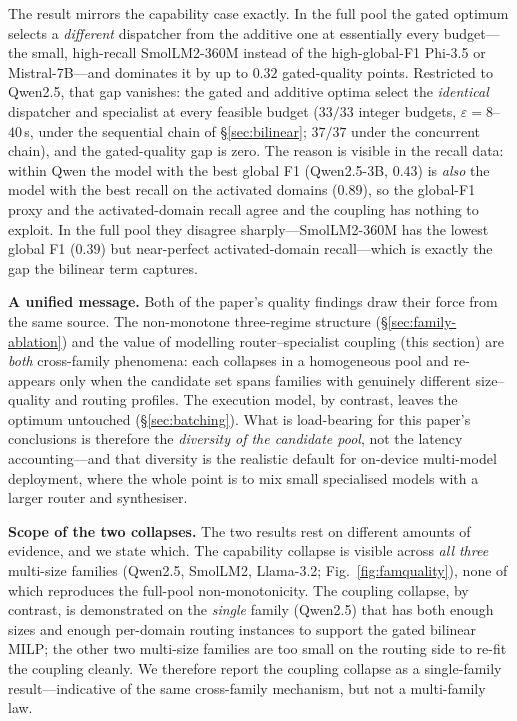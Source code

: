 \documentclass[11pt]{article}
\newcommand{\eps}{\varepsilon}
\begin{document}
The result mirrors the capability case exactly. In the full pool the gated optimum
selects a \emph{different} dispatcher from the additive one at essentially every
budget---the small, high-recall SmolLM2-360M instead of the high-global-F1 Phi-3.5
or Mistral-7B---and dominates it by up to $0.32$ gated-quality points. Restricted to
Qwen2.5, that gap vanishes: the gated and additive optima select the
\emph{identical} dispatcher and specialist at every feasible budget ($33/33$
integer budgets, $\eps=8$--$40$\,s, under the sequential chain of §\ref{sec:bilinear};
$37/37$ under the concurrent chain), and the
gated-quality gap is zero. The reason is visible in the recall data: within Qwen the
model with the best global F1 (Qwen2.5-3B, $0.43$) is \emph{also} the model with the
best recall on the activated domains ($0.89$), so the global-F1 proxy and the
activated-domain recall agree and the coupling has nothing to exploit. In the full
pool they disagree sharply---SmolLM2-360M has the lowest global F1 ($0.39$) but
near-perfect activated-domain recall---which is exactly the gap the bilinear term
captures.

\textbf{A unified message.} Both of the paper's quality findings draw their force
from the same source. The non-monotone three-regime structure
(§\ref{sec:family-ablation}) and the value of modelling router--specialist coupling
(this section) are \emph{both} cross-family phenomena: each collapses in a
homogeneous pool and re-appears only when the candidate set spans families with
genuinely different size--quality and routing profiles. The execution model, by
contrast, leaves the optimum untouched (§\ref{sec:batching}). What is load-bearing
for this paper's conclusions is therefore the \emph{diversity of the candidate
pool}, not the latency accounting---and that diversity is the realistic default for
on-device multi-model deployment, where the whole point is to mix small specialised
models with a larger router and synthesiser.

\textbf{Scope of the two collapses.} The two results rest on different amounts of
evidence, and we state which. The capability collapse is visible across \emph{all
three} multi-size families (Qwen2.5, SmolLM2, Llama-3.2; Fig.~\ref{fig:famquality}),
none of which reproduces the full-pool non-monotonicity. The coupling collapse, by
contrast, is demonstrated on the \emph{single} family (Qwen2.5) that has both enough
sizes and enough per-domain routing instances to support the gated bilinear MILP;
the other two multi-size families are too small on the routing side to re-fit the
coupling cleanly. We therefore report the coupling collapse as a single-family
result---indicative of the same cross-family mechanism, but not a multi-family law.
\end{document}
